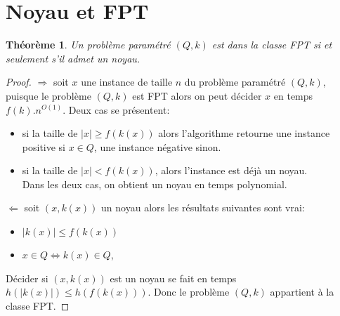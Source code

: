 \documentclass[a4paper, 12pt]{article}
\newtheorem{thm}{Théorème}
\begin{document}
\section{Noyau et FPT}
\begin{thm}
Un problème paramétré $(Q,k)$ est dans la classe FPT si et seulement s'il admet un noyau.
\end{thm}
\begin{proof}
$\Longrightarrow$ soit $x$ une instance de taille $n$ du problème paramétré $(Q,k)$, puisque le problème $(Q,k)$ est FPT alors on peut décider $x$ en temps $f(k).n^{O(1)}$. Deux cas se présentent:
\begin{itemize}
\item si la taille de $\vert x \vert \geqslant f(k(x))$ alors l'algorithme retourne une instance positive si $x \in Q$, une instance négative sinon.
\item si la taille de $\vert x \vert < f(k(x))$, alors l'instance est déjà un noyau.\\
Dans les deux cas, on obtient un noyau en temps polynomial.
\end{itemize}
$\Longleftarrow$ soit $(x,k(x))$ un noyau alors les résultats suivantes sont vrai:
\begin{itemize}
\item $\vert k(x) \vert \leqslant f (k(x))$ 
\item $x \in Q \Leftrightarrow k(x) \in Q$, 
\end{itemize}
Décider si $(x,k(x))$ est un noyau se fait en temps $h(\vert k(x)\vert) \leqslant h(f(k(x)))$. Donc le problème $(Q,k)$ appartient à la classe FPT.
\end{proof}
\end{document}
